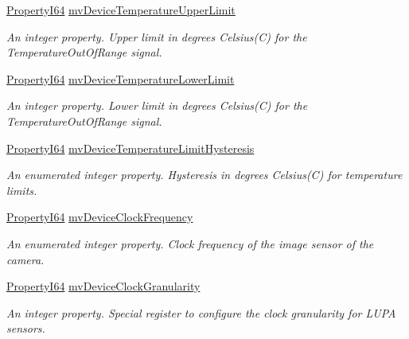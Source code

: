 \begin{DoxyCompactItemize}
\hyperlink{group___common_interface_ga81749b2696755513663492664a18a893}{Property\+I64} \hyperlink{classmv_i_m_p_a_c_t_1_1acquire_1_1_gen_i_cam_1_1_device_control_a56b212b9f38073690363d3a3ffbce955}{mv\+Device\+Temperature\+Upper\+Limit}
\begin{DoxyCompactList}\small\item\em An integer property. Upper limit in degrees Celsius(\+C) for the Temperature\+Out\+Of\+Range signal. \end{DoxyCompactList}\item 
\hyperlink{group___common_interface_ga81749b2696755513663492664a18a893}{Property\+I64} \hyperlink{classmv_i_m_p_a_c_t_1_1acquire_1_1_gen_i_cam_1_1_device_control_a0958db7ce440469a6c46cbe67e43e539}{mv\+Device\+Temperature\+Lower\+Limit}
\begin{DoxyCompactList}\small\item\em An integer property. Lower limit in degrees Celsius(\+C) for the Temperature\+Out\+Of\+Range signal. \end{DoxyCompactList}\item 
\hyperlink{group___common_interface_ga81749b2696755513663492664a18a893}{Property\+I64} \hyperlink{classmv_i_m_p_a_c_t_1_1acquire_1_1_gen_i_cam_1_1_device_control_a8f6f3385951482b605c5cf9a096741fa}{mv\+Device\+Temperature\+Limit\+Hysteresis}
\begin{DoxyCompactList}\small\item\em An enumerated integer property. Hysteresis in degrees Celsius(\+C) for temperature limits. \end{DoxyCompactList}\item 
\hyperlink{group___common_interface_ga81749b2696755513663492664a18a893}{Property\+I64} \hyperlink{classmv_i_m_p_a_c_t_1_1acquire_1_1_gen_i_cam_1_1_device_control_ad1a0fb21b8f3474949b2e854e23d5674}{mv\+Device\+Clock\+Frequency}
\begin{DoxyCompactList}\small\item\em An enumerated integer property. Clock frequency of the image sensor of the camera. \end{DoxyCompactList}\item 
\hyperlink{group___common_interface_ga81749b2696755513663492664a18a893}{Property\+I64} \hyperlink{classmv_i_m_p_a_c_t_1_1acquire_1_1_gen_i_cam_1_1_device_control_ab22c5302456ba77dc4ca840edd714703}{mv\+Device\+Clock\+Granularity}
\begin{DoxyCompactList}\small\item\em An integer property. Special register to configure the clock granularity for L\+U\+P\+A sensors. \end{DoxyCompactList}\item 

\end{DoxyCompactItemize}
